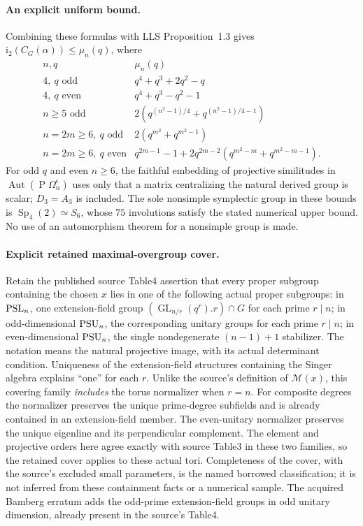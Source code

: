 \documentclass[10pt]{article}
\newcommand{\ii}{\mathrm i_2}\newcommand{\F}{\mathbb F}\newcommand{\GL}{\operatorname{GL}}\newcommand{\GU}{\operatorname{GU}}\newcommand{\Sp}{\operatorname{Sp}}\newcommand{\PGO}{\operatorname{PGO}}
\begin{document}
\paragraph{An explicit uniform bound.}
Combining these formulas with LLS Proposition~1.3 gives
$\ii(C_G(\alpha))\le\mu_n(q)$, where
\[
\begin{array}{c|l}
n,q&\mu_n(q)\\\hline
4,\ q\text{ odd}&q^4+q^3+2q^2-q\\
4,\ q\text{ even}&q^4+q^3-q^2-1\\
n\ge5\text{ odd}&2(q^{(n^2-1)/4}+q^{(n^2-1)/4-1})\\
n=2m\ge6,\ q\text{ odd}&2(q^{m^2}+q^{m^2-1})\\
n=2m\ge6,\ q\text{ even}&q^{2m-1}-1+2q^{2m-2}(q^{m^2-m}+q^{m^2-m-1}).
\end{array}
\]
For odd $q$ and even $n\ge6$, the faithful embedding of projective
similitudes in $\operatorname{Aut}(\operatorname{P}\Omega_n^\epsilon)$
uses only that a matrix centralizing the natural derived group is scalar;
$D_3=A_3$ is included. The sole nonsimple symplectic group in these bounds
is $\Sp_4(2)\simeq S_6$, whose $75$ involutions satisfy the stated numerical
upper bound. No use of an automorphism theorem for a nonsimple group is made.

\paragraph{Explicit retained maximal-overgroup cover.}
Retain the published source Table4 assertion that every proper subgroup
containing the chosen $x$ lies
in one of the following actual proper subgroups: in $\operatorname{PSL}_n$, one
extension-field group $(\GL_{n/r}(q^r).r)\cap G$ for each prime $r\mid n$;
in odd-dimensional $\operatorname{PSU}_n$, the corresponding unitary groups for each
prime $r\mid n$; in even-dimensional $\operatorname{PSU}_n$, the single nondegenerate
$(n-1)+1$ stabilizer. The notation means the natural projective image,
with its actual determinant condition. Uniqueness of the extension-field
structures containing the Singer algebra explains ``one'' for each $r$.
Unlike the source's definition of $\mathcal M(x)$, this covering family
\emph{includes} the torus normalizer when $r=n$. For composite degrees the
normalizer preserves the unique prime-degree subfields and is already
contained in an extension-field member. The even-unitary normalizer preserves
the unique eigenline and its perpendicular complement. The element and projective orders here agree exactly with source Table3
in these two families, so the retained cover applies to these actual tori.
Completeness of the cover, with the source's excluded small parameters,
is the named borrowed classification; it is not inferred from these
containment facts or a numerical sample. The acquired Bamberg erratum
adds the odd-prime extension-field groups in odd unitary dimension, already
present in the source's Table4.
\end{document}
